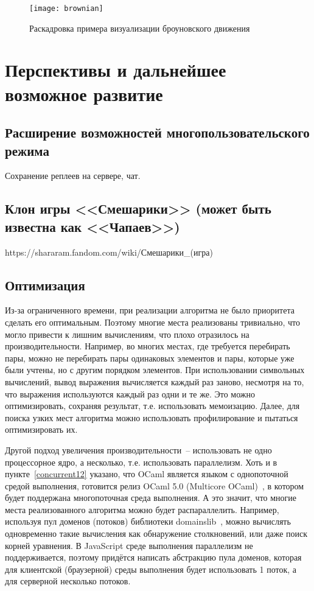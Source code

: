 \begin{figure}[H]
    \centering
    \texttt{[image: brownian]}
    \caption{Раскадровка примера визуализации броуновского движения\label{brownianfig}}
\end{figure}

\section{Перспективы и дальнейшее возможное развитие}

\subsection{Расширение возможностей многопользовательского режима}

\TODO Сохранение реплеев на сервере, чат.

\subsection{Клон игры <<Смешарики>> (может быть известна как <<Чапаев>>)}

\TODO https://shararam.fandom.com/wiki/Смешарики\_(игра)

\subsection{Оптимизация}\label{optimization}

Из-за ограниченного времени, при реализации алгоритма не было приоритета сделать его оптимальным.
Поэтому многие места реализованы тривиально, что могло привести к лишним вычислениям, что плохо отразилось на производительности.
Например, во многих местах, где требуется перебирать пары,
можно не перебирать пары одинаковых элементов и пары, которые уже были учтены, но с другим порядком элементов.
При использовании символьных вычислений, вывод выражения вычисляется каждый раз заново, несмотря на то, что выражения используются каждый раз одни и те же.
Это можно оптимизировать, сохраняя результат, т.е. использовать мемоизацию.
Далее, для поиска узких мест алгоритма можно использовать профилирование и пытаться оптимизировать их.

Другой подход увеличения производительности~-- использовать не одно процессорное ядро, а несколько, т.е. использовать параллелизм.
Хоть и в пункте~\ref{concurrent12} указано, что OCaml является языком с однопоточной средой выполнения,
готовится релиз OCaml 5.0 (Multicore OCaml)~\cite{infoqmulticore}, в котором будет поддержана многопоточная среда выполнения.
А это значит, что многие места реализованного алгоритма можно будет распараллелить.
Например, используя пул доменов (потоков) библиотеки domainslib~\cite{domainslibgithub},
можно вычислять одновременно такие вычисления как обнаружение столкновений, или даже поиск корней уравнения.
В JavaScript среде выполнения параллелизм не поддерживается, поэтому придётся написать абстракцию пула доменов,
которая для клиентской (браузерной) среды выполнения будет использовать 1 поток, а для серверной несколько потоков.

